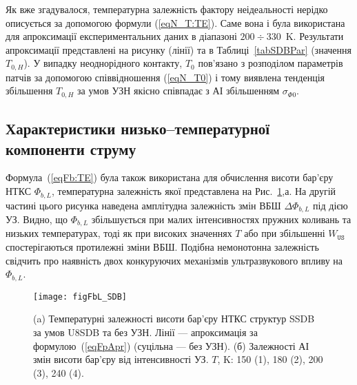 \documentclass[a4paper,14pt,oneside,openany]{memoir}
\begin{document}
Як вже згадувалося, температурна залежність фактору неідеальності нерідко описується за допомогою формули (\ref{eqN_T:TE}).
Саме вона і була використана для апроксимації експериментальних даних в діапазоні $200\div330$~K.
Результати апроксимації представлені на рисунку (лінії) та в Таблиці~\ref{tabSDBPar} (значення $T_{0,H}$).
У випадку неоднорідного контакту, $T_0$ пов'язано з розподілом параметрів патчів
за допомогою співвідношення (\ref{eqN_T0}) і тому виявлена тенденція
збільшення $T_{0,H}$ за умов УЗН якісно співпадає з АІ збільшенням $\sigma_{\Phi0}$.





\subsection{Характеристики низько--температурної компоненти струму}

Формула~(\ref{eqFb:TE}) була також використана для обчислення висоти бар'єру НТКС $\Phi_{b,L}$, температурна залежність
якої представлена на Рис.~\ref{figFbL_SDB},а.
На другій частині цього рисунка наведена амплітудна залежність змін ВБШ $\Delta \Phi_{b,L}$ під дією УЗ.
Видно, що $\Phi_{b,L}$ збільшується при малих інтенсивностях пружних коливань та низьких температурах,
тоді як при високих значеннях $T$ або при збільшенні $W_\mathtt{US}$ спостерігаються протилежні зміни ВБШ.
Подібна немонотонна залежність свідчить про наявність двох конкуруючих механізмів ультразвукового впливу на $\Phi_{b,L}$.


\begin{figure}
\center
\texttt{[image: figFbL\_SDB]}
\caption{\label{figFbL_SDB}
(a) Температурні залежності висоти бар'єру НТКС структур SSDB за умов U8SDB та без УЗН.
Лінії --- апроксимація за формулою~(\ref{eqFpApr}) (суцільна --- без УЗН).
(б) Залежності АІ змін висоти бар'єру від інтенсивності УЗ.
$T$, K: 150 (1), 180 (2), 200 (3), 240 (4).
}%
\end{figure}
\end{document}
